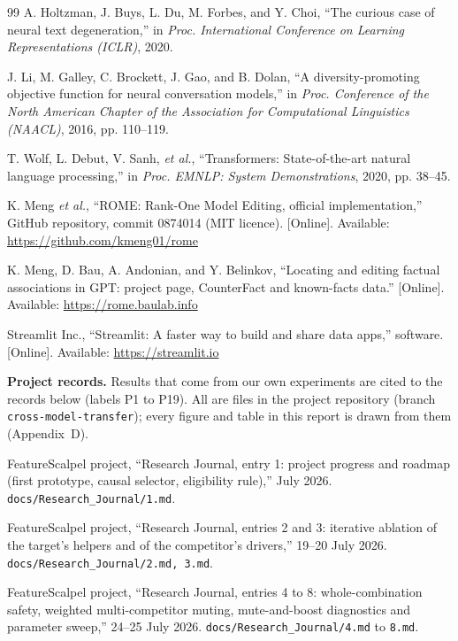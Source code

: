 \begin{thebibliography}{99}
 A. Holtzman, J. Buys, L. Du, M. Forbes, and Y. Choi, ``The curious case of neural text degeneration,'' in \textit{Proc. International Conference on Learning Representations (ICLR)}, 2020.

 J. Li, M. Galley, C. Brockett, J. Gao, and B. Dolan, ``A diversity-promoting objective function for neural conversation models,'' in \textit{Proc. Conference of the North American Chapter of the Association for Computational Linguistics (NAACL)}, 2016, pp. 110--119.

 T. Wolf, L. Debut, V. Sanh, \textit{et al.}, ``Transformers: State-of-the-art natural language processing,'' in \textit{Proc. EMNLP: System Demonstrations}, 2020, pp. 38--45.

 K. Meng \textit{et al.}, ``ROME: Rank-One Model Editing, official implementation,'' GitHub repository, commit 0874014 (MIT licence). [Online]. Available: \url{https://github.com/kmeng01/rome}

 K. Meng, D. Bau, A. Andonian, and Y. Belinkov, ``Locating and editing factual associations in GPT: project page, CounterFact and known-facts data.'' [Online]. Available: \url{https://rome.baulab.info}

 Streamlit Inc., ``Streamlit: A faster way to build and share data apps,'' software. [Online]. Available: \url{https://streamlit.io}

\medskip\noindent\textbf{Project records.} Results that come from our own experiments are cited to the records below (labels P1 to P19). All are files in the project repository (branch \texttt{cross-model-transfer}); every figure and table in this report is drawn from them (Appendix~D).\par\smallskip

 FeatureScalpel project, ``Research Journal, entry 1: project progress and roadmap (first prototype, causal selector, eligibility rule),'' July 2026. \texttt{docs/Research\_Journal/1.md}.

 FeatureScalpel project, ``Research Journal, entries 2 and 3: iterative ablation of the target's helpers and of the competitor's drivers,'' 19--20 July 2026. \texttt{docs/Research\_Journal/2.md, 3.md}.

 FeatureScalpel project, ``Research Journal, entries 4 to 8: whole-combination safety, weighted multi-competitor muting, mute-and-boost diagnostics and parameter sweep,'' 24--25 July 2026. \texttt{docs/Research\_Journal/4.md} to \texttt{8.md}.


\end{thebibliography}
